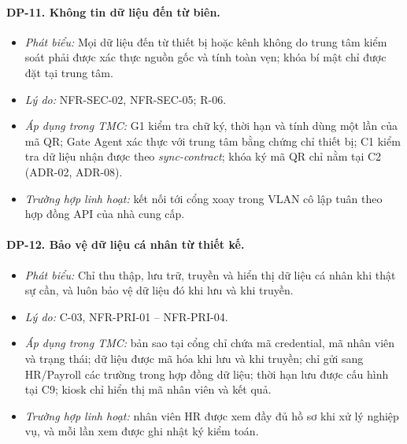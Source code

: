 \paragraph{DP-11. Không tin dữ liệu đến từ biên.}\label{dp:11}
\begin{itemize}
    \item \textit{Phát biểu:} Mọi dữ liệu đến từ thiết bị hoặc kênh không do trung tâm kiểm soát phải được xác thực nguồn gốc và tính toàn vẹn; khóa bí mật chỉ được đặt tại trung tâm.
    \item \textit{Lý do:} NFR-SEC-02, NFR-SEC-05; R-06.
    \item \textit{Áp dụng trong TMC:} G1 kiểm tra chữ ký, thời hạn và tính dùng một lần của mã QR; Gate Agent xác thực với trung tâm bằng chứng chỉ thiết bị; C1 kiểm tra dữ liệu nhận được theo \textit{sync-contract}; khóa ký mã QR chỉ nằm tại C2 (ADR-02, ADR-08).
    \item \textit{Trường hợp linh hoạt:} kết nối tới cổng xoay trong VLAN cô lập tuân theo hợp đồng API của nhà cung cấp.
\end{itemize}

\paragraph{DP-12. Bảo vệ dữ liệu cá nhân từ thiết kế.}\label{dp:12}
\begin{itemize}
    \item \textit{Phát biểu:} Chỉ thu thập, lưu trữ, truyền và hiển thị dữ liệu cá nhân khi thật sự cần, và luôn bảo vệ dữ liệu đó khi lưu và khi truyền.
    \item \textit{Lý do:} C-03, NFR-PRI-01 -- NFR-PRI-04.
    \item \textit{Áp dụng trong TMC:} bản sao tại cổng chỉ chứa mã credential, mã nhân viên và trạng thái; dữ liệu được mã hóa khi lưu và khi truyền; chỉ gửi sang HR/Payroll các trường trong hợp đồng dữ liệu; thời hạn lưu được cấu hình tại C9; kiosk chỉ hiển thị mã nhân viên và kết quả.
    \item \textit{Trường hợp linh hoạt:} nhân viên HR được xem đầy đủ hồ sơ khi xử lý nghiệp vụ, và mỗi lần xem được ghi nhật ký kiểm toán.
\end{itemize}

